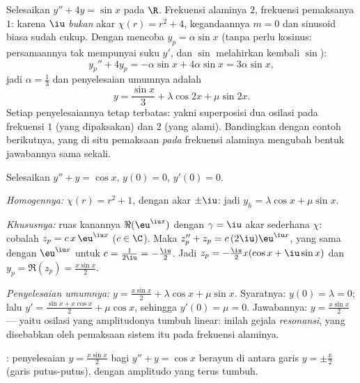 \begin{example}\label{ex:b1:diffeq:offresonance}
Selesaikan $y'' + 4y = \sin x$ pada $\R$. Frekuensi alaminya $2$, frekuensi
pemaksanya $1$: karena $\iu$ \emph{bukan} akar $\chi(r) = r^2
+ 4$, kegandaannya $m = 0$ dan sinusoid biasa sudah cukup.
Dengan mencoba $y_p = \alpha\sin x$ (tanpa perlu kosinus: persamaannya tak
mempunyai suku $y'$, dan $\sin$ melahirkan kembali $\sin$):
\[
y_p'' + 4y_p = -\alpha\sin x + 4\alpha\sin x = 3\alpha\sin x ,
\]
jadi $\alpha = \frac13$ dan penyelesaian umumnya adalah
\[
y = \frac{\sin x}3 + \lambda\cos 2x + \mu\sin 2x .
\]
Setiap penyelesaiannya tetap terbatas: yakni superposisi dua osilasi
pada frekuensi $1$ (yang dipaksakan) dan $2$ (yang alami). Bandingkan dengan
contoh berikutnya, yang di situ pemaksaan \emph{pada} frekuensi alaminya
mengubah bentuk jawabannya sama sekali.
\end{example}

\begin{example}\label{ex:b1:diffeq:oscillation}
Selesaikan $y'' + y = \cos x$, $y(0) = 0$, $y'(0) = 0$.

\emph{Homogennya:} $\chi(r) = r^2 + 1$, dengan akar $\pm\iu$: jadi $y_h =
\lambda\cos x + \mu \sin x$.

\emph{Khususnya:} ruas kanannya $\Re(\eu^{\iu x})$ dengan $\gamma =
\iu$ akar sederhana $\chi$: cobalah $z_p = c\, x\, \eu^{\iu x}$
($c \in \C$). Maka $z_p'' + z_p = c\,(2\iu)\eu^{\iu x}$, yang sama dengan
$\eu^{\iu x}$ untuk $c = \frac{1}{2\iu} = -\frac\iu2$. Jadi $z_p =
-\frac{\iu}{2} x (\cos x + \iu \sin x)$ dan $y_p = \Re(z_p) =
\frac{x \sin x}{2}$.

\emph{Penyelesaian umumnya:} $y = \frac{x\sin x}{2} + \lambda\cos x +
\mu\sin x$. Syaratnya: $y(0) = \lambda = 0$; lalu $y' = \frac{\sin x +
x\cos x}{2} + \mu\cos x$, sehingga $y'(0) = \mu = 0$. Jawabannya: $y =
\frac{x\sin x}{2}$ --- yaitu osilasi yang amplitudonya tumbuh linear:
inilah gejala \emph{resonansi}, yang disebabkan oleh pemaksaan
sistem itu pada frekuensi alaminya.
\end{example}

\begin{omfigure}

{\small {}: penyelesaian $y = \frac{x \sin x}{2}$ bagi $y'' + y =
\cos x$ berayun di antara garis $y = \pm\frac x2$ (garis putus-putus), dengan
amplitudo yang terus tumbuh.}
\end{omfigure}

